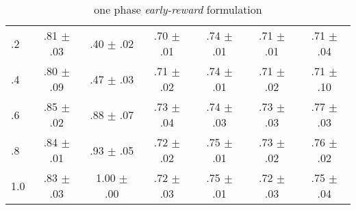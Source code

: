 \begin{frame}
\begin{table}
\begin{subtable}{.5\textwidth}
\begin{tabular}{lcccccc}
			.2 & .81 $\pm$ .03 & .40 $\pm$ .02 & .70 $\pm$ .01 & .74 $\pm$ .01 & .71 $\pm$ .01 & .71 $\pm$ .04 \\
			.4 & .80 $\pm$ .09 & .47 $\pm$ .03 & .71 $\pm$ .02 & .74 $\pm$ .01 & .71 $\pm$ .02 & .71 $\pm$ .10 \\
			.6 & .85 $\pm$ .02 & .88 $\pm$ .07 & .73 $\pm$ .04 & .74 $\pm$ .03 & .73 $\pm$ .03 & .77 $\pm$ .03 \\
			.8 & .84 $\pm$ .01 & .93 $\pm$ .05 & .72 $\pm$ .02 & .75 $\pm$ .01 & .73 $\pm$ .02 & .76 $\pm$ .02 \\
			1.0 & .83 $\pm$ .03 & 1.00 $\pm$ .00 & .72 $\pm$ .03 & .75 $\pm$ .01 & .72 $\pm$ .03 & .75 $\pm$ .04 \\
			\bottomrule
		\end{tabular}
		\caption{one phase \emph{early-reward} formulation}
		\label{tab:alpha:earlyreward}
	\end{subtable}
	
\end{table}

\end{frame}


